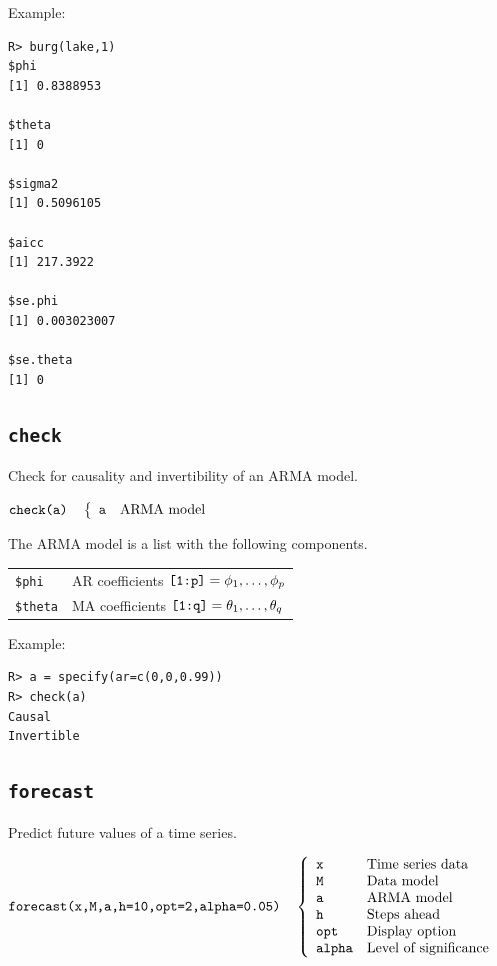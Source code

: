\documentclass[11pt]{article}
\begin{document}
\noindent
Example:
\begin{verbatim}
R> burg(lake,1)
$phi
[1] 0.8388953

$theta
[1] 0

$sigma2
[1] 0.5096105

$aicc
[1] 217.3922

$se.phi
[1] 0.003023007

$se.theta
[1] 0
\end{verbatim}

\newpage

\subsection{\tt check}
Check for causality and invertibility of an ARMA model.

\bigskip
$
\hbox{\tt check(a)}\quad\left\{\begin{array}{ll}
{\tt a} & \hbox{ARMA model}\\
\end{array}\right.
$

\bigskip
\noindent
The ARMA model is a list with the following components.

\begin{center}
\begin{tabular}{ll}
{\tt \$phi} & AR coefficients $\hbox{\tt[1:p]}=\phi_1,\ldots,\phi_p$\\
{\tt \$theta} & MA coefficients $\hbox{\tt[1:q]}=\theta_1,\ldots,\theta_q$
\end{tabular}
\end{center}

\noindent
Example:
\begin{verbatim}
R> a = specify(ar=c(0,0,0.99))
R> check(a)
Causal
Invertible
\end{verbatim}

\newpage

\subsection{\tt forecast}
Predict future values of a time series.

\bigskip
$
\hbox{\tt forecast(x,M,a,h=10,opt=2,alpha=0.05)}\quad\left\{\begin{array}{ll}
{\tt x} & \hbox{Time series data}\\
{\tt M} & \hbox{Data model}\\
{\tt a} & \hbox{ARMA model}\\
{\tt h} & \hbox{Steps ahead}\\
{\tt opt} & \hbox{Display option}\\
{\tt alpha} & \hbox{Level of significance}
\end{array}\right.
$
\end{document}
